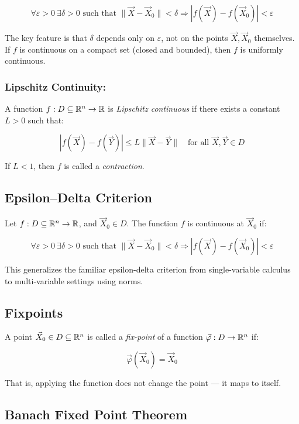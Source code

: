 \[
    \forall \varepsilon > 0 \ \exists \delta > 0 \text{ such that } \|\vec{X} - \vec{X}_0\| < \delta 
    \Rightarrow |f(\vec{X}) - f(\vec{X}_0)| < \varepsilon
\]

The key feature is that \( \delta \) depends only on \( \varepsilon \), not on the points 
\( \vec{X}, \vec{X}_0 \) themselves.  
If \( f \) is continuous on a compact set (closed and bounded), then \( f \) is uniformly continuous.

\subsubsection{Lipschitz Continuity:}  

A function \( f : D \subseteq \mathbb{R}^n \to \mathbb{R} \) is \emph{Lipschitz continuous} if there 
exists a constant \( L > 0 \) such that:

\[
    |f(\vec{X}) - f(\vec{Y})| \le L \|\vec{X} - \vec{Y}\| \quad \text{for all } \vec{X}, \vec{Y} \in D
\]

If \( L < 1 \), then \( f \) is called a \emph{contraction}.

\subsection{Epsilon–Delta Criterion}

Let \( f : D \subseteq \mathbb{R}^n \to \mathbb{R} \), and \( \vec{X}_0 \in D \). The function 
\( f \) is continuous at \( \vec{X}_0 \) if:

\[
    \forall \varepsilon > 0 \ \exists \delta > 0 \text{ such that } \|\vec{X} - \vec{X}_0\| 
    < \delta \Rightarrow |f(\vec{X}) - f(\vec{X}_0)| < \varepsilon
\]

This generalizes the familiar epsilon-delta criterion from single-variable calculus to multi-variable 
settings using norms.

\subsection{Fixpoints}
  
A point \( \vec{X}_0 \in D \subseteq \mathbb{R}^n \) is called a \emph{fix-point} of a function 
\( \vec{\varphi} : D \to \mathbb{R}^n \) if:

\[
    \vec{\varphi}(\vec{X}_0) = \vec{X}_0
\]

That is, applying the function does not change the point — it maps to itself.

\subsection{Banach Fixed Point Theorem}

